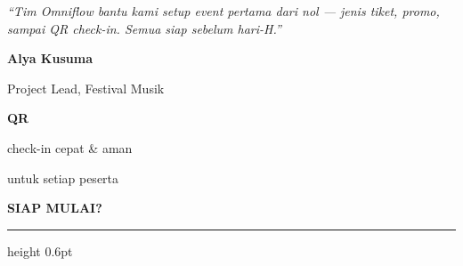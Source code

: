 \documentclass[a4paper]{article}
\newcommand{\sectiontitle}[1]{%
    \vspace{10pt}%
    {\fontsize{13}{16}\selectfont\bfseries\color{BlueDark} #1}\par\vspace{3pt}%
    {\color{BluePrimary}\hrule height 0.6pt}\par\vspace{8pt}%
}
\begin{document}
\noindent
\begin{minipage}[t]{0.485\textwidth}
    \colorbox{BlueBg}{%
        \begin{minipage}{\dimexpr\linewidth-2\fboxsep\relax}
            {\fontsize{9.5}{13}\selectfont\color{TextDark}\textit{``Tim Omniflow bantu kami setup event pertama dari nol --- jenis tiket, promo, sampai QR check-in. Semua siap sebelum hari-H.''}}\par\vspace{4pt}
            {\fontsize{8.5}{11}\selectfont\bfseries\color{BluePrimary} Alya Kusuma}\par
            {\fontsize{8}{10}\selectfont\color{TextLight} Project Lead, Festival Musik}
        \end{minipage}}
\end{minipage}%
\hfill
\begin{minipage}[t]{0.485\textwidth}
    \colorbox{BlueBg}{%
        \begin{minipage}{\dimexpr\linewidth-2\fboxsep\relax}
            \begin{center}
                {\fontsize{20}{24}\selectfont\bfseries\color{BluePrimary} QR}\par
                {\fontsize{9.5}{12}\selectfont\color{TextDark} check-in cepat \& aman}\par
                {\fontsize{9.5}{12}\selectfont\color{TextDark} untuk setiap peserta}
            \end{center}
        \end{minipage}}
\end{minipage}

\sectiontitle{SIAP MULAI?}
\end{document}

